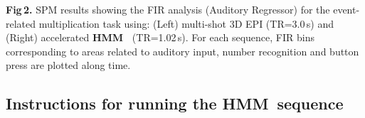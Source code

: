 \documentclass[12pt,twoside]{article}
\newcommand{\HMM}{{\color{darkred}\textbf{\textsf{HMM\ }}}}
\begin{document}
\noindent\parbox[b]{160mm}{\small\textsf{\textbf{Fig\,2.} SPM results
    showing the FIR analysis (Auditory Regressor) for the
    event-related multiplication task using: (Left) multi-shot 3D EPI
    (TR=3.0\,s) and (Right) {\color{studyblue}accelerated \HMM
      (TR=1.02\,s)}. For each sequence, FIR bins corresponding to
    areas related to auditory input, number recognition and button
    press are plotted along time.}}

\begin{spacing}{1}




\section{Instructions for running the \HMM sequence}


\end{spacing}




\newpage

\cleartooddpage\rule{0mm}{0mm}
\fancyhead[RO]{\textsf{\small{\textbf{\color{studyblue}\thepage/\pageref{LastPage}}}}}
\fancyhead[LE]{\textsf{\small{\textbf{\color{studyblue}\thepage/\pageref{LastPage}}}}}
\cleartooddpage
\end{document}
